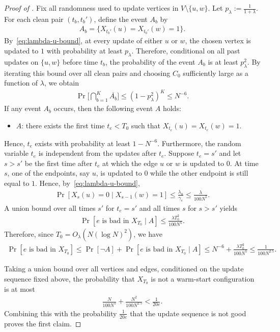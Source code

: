 \documentclass[10pt,a4paper]{amsart}
\renewcommand{\Pr}{\mathop{\mathrm{Pr}}\nolimits}
\newcommand{\defeq}{:=}
\begin{document}
\begin{proof}[Proof of ]
Fix all randomness used to update vertices in $V \setminus \{u,w\}$.
Let $p_\lambda \defeq \frac{1}{1+\lambda}$. For each clean pair $(t_b,t_b')$, define the event $A_b$ by
\begin{align*}
A_b = \{X_{t_b'}(u) = X_{t_b'}(w) = 1\}.
\end{align*}
By~\eqref{eq:lambda-u-bound}, at every update of either $u$ or $w$, the chosen vertex is updated to $1$ with probability at least $p_\lambda$. Therefore, conditional on all past updates on $\{u,w\}$ before time $t_b$, the probability of the event $A_b$ is at least $p_\lambda^2$.
By iterating this bound over all clean pairs and choosing $C_0$ sufficiently large as a function of $\lambda$, we obtain
\begin{align*}
\Pr\Big[\bigcap_{b = 1}^K \overline{A_b}\Big] \leq (1-p_\lambda^2)^K \leq N^{-6}.
\end{align*}
If any event $A_b$ occurs, then the following event $A$ holds:
\begin{itemize}
\item $A$: there exists the first time $t_e < T_0$ such that $X_{t_e}(u) = X_{t_e}(w) = 1$.
\end{itemize}
Hence, $t_e$ exists with probability at least $1 - N^{-6}$. Furthermore, the random variable $t_e$ %
is independent from the updates after $t_e$.
Suppose $t_e = s'$ and let $s > s'$ be the first time after $t_e$ at which the edge $u$ or $w$ is updated to $0$.
At time $s$, one of the endpoints, say $u$, is updated to $0$ while the other endpoint is still equal to $1$. Hence, by~\eqref{eq:lambda-u-bound},
\begin{align*}
\Pr[X_s(u) = 0 \mid X_{s-1}(w) = 1] \leq \frac{\lambda_u}{\gamma_e} \leq \frac{\lambda}{100N^5}.
\end{align*}
A union bound over all times $s'$ for $t_e = s'$ and all times $s$ for $s > s'$ yields
\begin{align*}
\Pr[e \text{ is bad in } X_{T_0} \mid A] \leq \frac{\lambda T_0^2}{100N^5}.
\end{align*}
Therefore, since $T_0 = O_\lambda(N(\log N)^2)$, we have
\begin{align*}
\Pr[e \text{ is bad in } X_{T_0}] \leq \Pr[\neg A] + \Pr[e \text{ is bad in } X_{T_0} \mid A] \leq N^{-6} + \frac{\lambda T_0^2}{100N^5} \leq \frac{1}{100N^{2.5}}.
\end{align*}

Taking a union bound over all vertices and edges, conditioned on the update sequence fixed above, the probability that $X_{T_0}$ is not a warm-start configuration is at most
\begin{align}\label{eq:warm-start-configuration-probability}
\frac{N}{100N^5} + \frac{N^2}{100N^{2.5}} < \frac{1}{20e}.
\end{align}
Combining this with the probability $\frac{1}{20e}$ that the update sequence is not good proves the first claim.


\end{proof}
\end{document}
